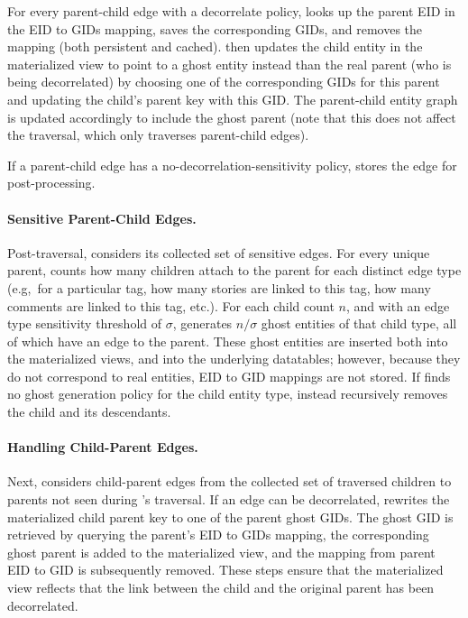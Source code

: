For every parent-child edge with a decorrelate policy, \name looks up the parent EID in the
EID to GIDs mapping, saves the corresponding GIDs, and removes the mapping (both persistent and
cached).
\name then updates the child entity in the materialized view to point to a ghost entity instead
than the real parent (who is being decorrelated) by choosing one of the corresponding GIDs for this
parent and updating the child's parent key with this GID.  The parent-child entity graph is updated
accordingly to include the ghost parent (note that this does not affect the traversal, which only
traverses parent-child edges).

If a parent-child edge has a no-decorrelation-sensitivity policy, \name stores the edge for
post-processing.

\paragraph{Sensitive Parent-Child Edges.}
Post-traversal, \name considers its collected set of sensitive edges. For every unique parent,
\name counts how many children attach to the parent for each distinct edge type (e.g,\ for a
particular tag, how many stories are linked to this tag, how many comments are linked to this tag,
etc.). For each child count $n$, and with an edge type sensitivity threshold of $\sigma$,
\name generates $n / \sigma$ ghost entities of that child type, all of which have an edge to the parent.
These ghost entities are inserted both into the materialized views, and into the underlying
datatables; however, because they do not correspond to real entities, EID to GID mappings are not
stored.
If \name finds no ghost generation policy for the child entity type, \name instead recursively
removes the child and its descendants.

\paragraph{Handling Child-Parent Edges.}
Next, \name considers child-parent edges from the collected set of traversed children to parents
not seen during \name's traversal. If an
edge can be decorrelated, \name rewrites the materialized child parent key to one of the parent
ghost GIDs. The ghost GID is retrieved by querying the parent's EID to GIDs mapping, the
corresponding ghost parent is added to the materialized view,
and the mapping from parent EID to GID is subsequently removed. These steps ensure that the
materialized view reflects that the link between the child and the original parent has been
decorrelated.

